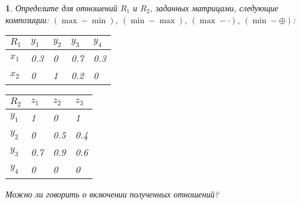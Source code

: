 \documentclass[11pt,a4paper,oneside]{article}
\newenvironment{problem}{
	\medskip
	\begin{problem-internal}
	}{
	\end{problem-internal}
}
\newtheorem{problem-internal}{}
\begin{document}
	\begin{problem}
		Определите для отношений $R_1$ и $R_2$, заданных матрицами, следующие композиции: $(\max-\min)$, $(\min-\max)$, $(\max-\cdot)$, $(\min-\oplus)$:
		\begin{table}[!hbtp]
			\begin{tabular}{|l|l|l|l|l|}
				\hline
				$R_1$ & $y_1$ & $y_2$ & $y_3$ & $y_4$ \\ \hline
				$x_1$ & 0.3   & 0     & 0.7   & 0.3   \\ \hline
				$x_2$ & 0     & 1     & 0.2   & 0     \\ \hline
			\end{tabular}
		\end{table}
		\begin{table}[!hbtp]
			\begin{tabular}{|l|l|l|l|}
				\hline
				$R_2$ & $z_1$ & $z_2$ & $z_3$ \\ \hline
				$y_1$ & 1     & 0     & 1     \\ \hline
				$y_2$ & 0     & 0.5   & 0.4   \\ \hline
				$y_3$ & 0.7   & 0.9   & 0.6   \\ \hline
				$y_4$ & 0     & 0     & 0     \\ \hline
			\end{tabular}
		\end{table}
		\newline
		Можно ли говорить о включении полученных отношений?
	\end{problem}
\end{document}

